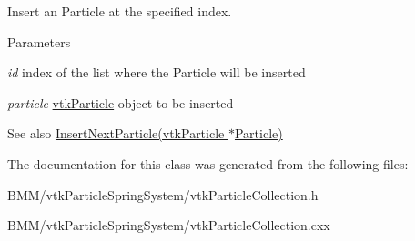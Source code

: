 Insert an Particle at the specified index. 


\begin{DoxyParams}{Parameters}
\item[{\em id}]index of the list where the Particle will be inserted \item[{\em particle}]\hyperlink{classvtkParticle}{vtkParticle} object to be inserted \end{DoxyParams}
\begin{DoxySeeAlso}{See also}
\hyperlink{classvtkParticleCollection_a72a443ca560badd2a938c7f1943bb7bd}{InsertNextParticle(vtkParticle $\ast$Particle)} 
\end{DoxySeeAlso}


The documentation for this class was generated from the following files:\begin{DoxyCompactItemize}
\item 
BMM/vtkParticleSpringSystem/vtkParticleCollection.h\item 
BMM/vtkParticleSpringSystem/vtkParticleCollection.cxx\end{DoxyCompactItemize}
